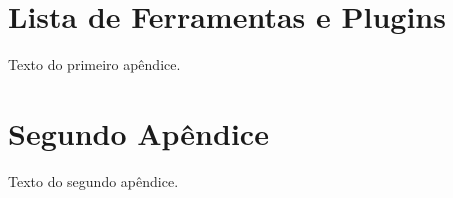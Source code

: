 \begin{apendicesenv}

\partapendices

\chapter{Lista de Ferramentas e Plugins}

Texto do primeiro apêndice.

\chapter{Segundo Apêndice}

Texto do segundo apêndice.

\end{apendicesenv}
